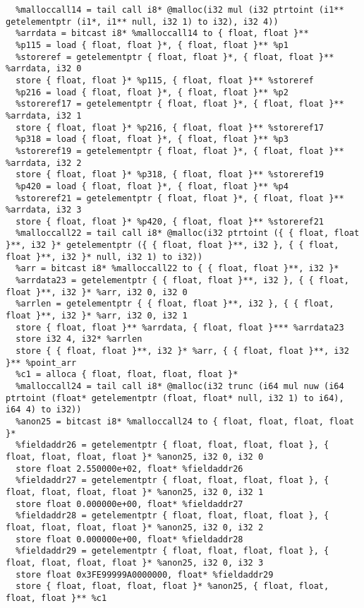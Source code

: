 \documentclass[main.tex]{subfiles}
\begin{document}
{\begin{lstlisting}
  %malloccall14 = tail call i8* @malloc(i32 mul (i32 ptrtoint (i1** getelementptr (i1*, i1** null, i32 1) to i32), i32 4))
  %arrdata = bitcast i8* %malloccall14 to { float, float }**
  %p115 = load { float, float }*, { float, float }** %p1
  %storeref = getelementptr { float, float }*, { float, float }** %arrdata, i32 0
  store { float, float }* %p115, { float, float }** %storeref
  %p216 = load { float, float }*, { float, float }** %p2
  %storeref17 = getelementptr { float, float }*, { float, float }** %arrdata, i32 1
  store { float, float }* %p216, { float, float }** %storeref17
  %p318 = load { float, float }*, { float, float }** %p3
  %storeref19 = getelementptr { float, float }*, { float, float }** %arrdata, i32 2
  store { float, float }* %p318, { float, float }** %storeref19
  %p420 = load { float, float }*, { float, float }** %p4
  %storeref21 = getelementptr { float, float }*, { float, float }** %arrdata, i32 3
  store { float, float }* %p420, { float, float }** %storeref21
  %malloccall22 = tail call i8* @malloc(i32 ptrtoint ({ { float, float }**, i32 }* getelementptr ({ { float, float }**, i32 }, { { float, float }**, i32 }* null, i32 1) to i32))
  %arr = bitcast i8* %malloccall22 to { { float, float }**, i32 }*
  %arrdata23 = getelementptr { { float, float }**, i32 }, { { float, float }**, i32 }* %arr, i32 0, i32 0
  %arrlen = getelementptr { { float, float }**, i32 }, { { float, float }**, i32 }* %arr, i32 0, i32 1
  store { float, float }** %arrdata, { float, float }*** %arrdata23
  store i32 4, i32* %arrlen
  store { { float, float }**, i32 }* %arr, { { float, float }**, i32 }** %point_arr
  %c1 = alloca { float, float, float, float }*
  %malloccall24 = tail call i8* @malloc(i32 trunc (i64 mul nuw (i64 ptrtoint (float* getelementptr (float, float* null, i32 1) to i64), i64 4) to i32))
  %anon25 = bitcast i8* %malloccall24 to { float, float, float, float }*
  %fieldaddr26 = getelementptr { float, float, float, float }, { float, float, float, float }* %anon25, i32 0, i32 0
  store float 2.550000e+02, float* %fieldaddr26
  %fieldaddr27 = getelementptr { float, float, float, float }, { float, float, float, float }* %anon25, i32 0, i32 1
  store float 0.000000e+00, float* %fieldaddr27
  %fieldaddr28 = getelementptr { float, float, float, float }, { float, float, float, float }* %anon25, i32 0, i32 2
  store float 0.000000e+00, float* %fieldaddr28
  %fieldaddr29 = getelementptr { float, float, float, float }, { float, float, float, float }* %anon25, i32 0, i32 3
  store float 0x3FE99999A0000000, float* %fieldaddr29
  store { float, float, float, float }* %anon25, { float, float, float, float }** %c1

\end{lstlisting}}
\end{document}
